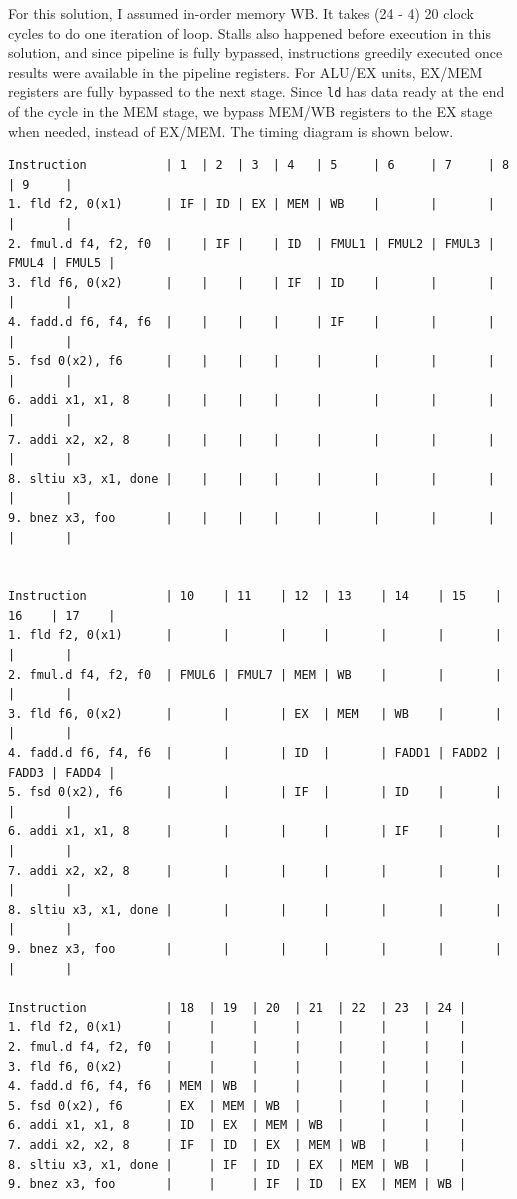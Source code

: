 \documentclass[11pt]{article}
\begin{document}
\begin{Answer}

	For this solution, I assumed in-order memory WB. It takes (24 - 4) 20 clock cycles to do one iteration of loop. Stalls also happened before execution in this solution, and since pipeline is fully bypassed, instructions greedily executed once results were available in the pipeline registers. For ALU/EX units, EX/MEM registers are fully bypassed to the next stage. Since \verb|ld| has data ready at the end of the cycle in the MEM stage, we bypass MEM/WB registers to the EX stage when needed, instead of EX/MEM. The timing diagram is shown below.
	\begin{verbatim}
Instruction           | 1  | 2  | 3  | 4   | 5     | 6     | 7     | 8     | 9     |
1. fld f2, 0(x1)      | IF | ID | EX | MEM | WB    |       |       |       |       |
2. fmul.d f4, f2, f0  |    | IF |    | ID  | FMUL1 | FMUL2 | FMUL3 | FMUL4 | FMUL5 |
3. fld f6, 0(x2)      |    |    |    | IF  | ID    |       |       |       |       |
4. fadd.d f6, f4, f6  |    |    |    |     | IF    |       |       |       |       |
5. fsd 0(x2), f6      |    |    |    |     |       |       |       |       |       |
6. addi x1, x1, 8     |    |    |    |     |       |       |       |       |       |
7. addi x2, x2, 8     |    |    |    |     |       |       |       |       |       |
8. sltiu x3, x1, done |    |    |    |     |       |       |       |       |       |
9. bnez x3, foo       |    |    |    |     |       |       |       |       |       |


Instruction           | 10    | 11    | 12  | 13    | 14    | 15    | 16    | 17    |
1. fld f2, 0(x1)      |       |       |     |       |       |       |       |       |
2. fmul.d f4, f2, f0  | FMUL6 | FMUL7 | MEM | WB    |       |       |       |       |
3. fld f6, 0(x2)      |       |       | EX  | MEM   | WB    |       |       |       |
4. fadd.d f6, f4, f6  |       |       | ID  |       | FADD1 | FADD2 | FADD3 | FADD4 |
5. fsd 0(x2), f6      |       |       | IF  |       | ID    |       |       |       |
6. addi x1, x1, 8     |       |       |     |       | IF    |       |       |       |
7. addi x2, x2, 8     |       |       |     |       |       |       |       |       |
8. sltiu x3, x1, done |       |       |     |       |       |       |       |       |
9. bnez x3, foo       |       |       |     |       |       |       |       |       |

Instruction           | 18  | 19  | 20  | 21  | 22  | 23  | 24 |
1. fld f2, 0(x1)      |     |     |     |     |     |     |    |
2. fmul.d f4, f2, f0  |     |     |     |     |     |     |    |
3. fld f6, 0(x2)      |     |     |     |     |     |     |    |
4. fadd.d f6, f4, f6  | MEM | WB  |     |     |     |     |    |
5. fsd 0(x2), f6      | EX  | MEM | WB  |     |     |     |    |
6. addi x1, x1, 8     | ID  | EX  | MEM | WB  |     |     |    |
7. addi x2, x2, 8     | IF  | ID  | EX  | MEM | WB  |     |    |
8. sltiu x3, x1, done |     | IF  | ID  | EX  | MEM | WB  |    |
9. bnez x3, foo       |     |     | IF  | ID  | EX  | MEM | WB |
\end{verbatim}

\end{Answer}
\newpage
\end{document}
